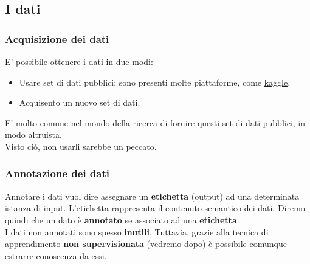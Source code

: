 \subsection{I dati}
\subsubsection{Acquisizione dei dati}
E' possibile ottenere i dati in due modi:
\begin{itemize}
    \item Usare set di dati pubblici: sono presenti molte
%
    piattaforme, come \href{https://www.kaggle.com/datasets}{kaggle}.
    \item Acquisento un nuovo set di dati.
\end{itemize}
E' molto  comune nel mondo della ricerca di fornire questi set di 
%
dati pubblici, in modo altruista.
\\
Visto ciò, non usarli sarebbe un peccato.
\subsubsection{Annotazione dei dati}
{
    Annotare i dati vuol dire assegnare un \textbf{etichetta} 
%    
    (output) ad una determinata istanza di input.
%
    L'etichetta rappresenta il contenuto semantico dei dati.
}
Diremo quindi che un dato è \textbf{annotato} se associato ad una 
%
\textbf{etichetta}.
\\
I dati non annotati sono spesso \textbf{inutili}.
Tuttavia, grazie alla tecnica di apprendimento 
%
\textbf{non supervisionata} (vedremo dopo) è possibile comunque 
%
estrarre conoscenza da essi.
